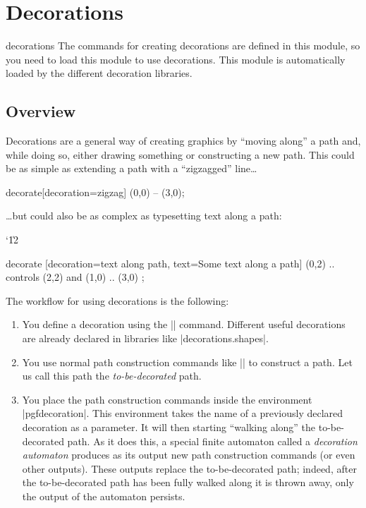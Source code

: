 %
%
%

\section{Decorations}
\label{section-base-decorations}


\begin{pgfmodule}{decorations}
  The commands for creating decorations are defined in this
  module, so you need to load this module to use decorations. This
  module is automatically loaded by the different decoration
  libraries.
\end{pgfmodule}


\subsection{Overview}

Decorations are a general way of creating graphics by ``moving along''
a path and, while doing so, either drawing something or constructing a
new path. This could be as simple as extending a path with a
``zigzagged'' line\ldots

\begin{codeexample}[]
\tikz \draw decorate[decoration=zigzag] {(0,0) -- (3,0)};
\end{codeexample}
\ldots but could also be as complex as typesetting text along a path:
{\catcode`\|12
\begin{codeexample}[]
\tikz \path decorate [decoration={text along path,
     text={Some text along a path}}]
   { (0,2) .. controls (2,2) and (1,0) .. (3,0) };
\end{codeexample}
}

The workflow for using decorations is the following:
\begin{enumerate}
\item You define a decoration using the |\pgfdeclaredecoration|
  command. Different useful decorations are already declared in
  libraries like |decorations.shapes|.
\item You use normal path construction commands like |\pgfpathlineto|
  to construct a path. Let us call this path the
  \emph{to-be-decorated} path.
\item You place the path construction commands inside the environment
  |{pgfdecoration}|. This environment takes the name of a previously
  declared decoration as a parameter. It will then starting ``walking
  along'' the to-be-decorated path. As it does this, a special finite
  automaton called a \emph{decoration automaton} produces as its
  output new path construction commands (or even other outputs). These
  outputs replace the to-be-decorated path; indeed, after the
  to-be-decorated path has been fully walked along it is thrown away,
  only the output of the automaton persists.
\end{enumerate}

